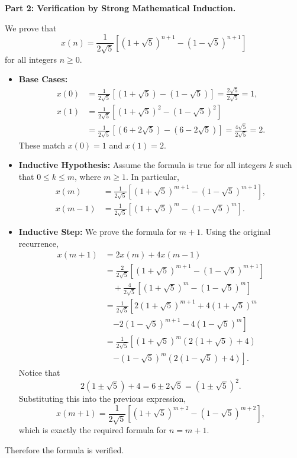 \documentclass[12pt,a4paper]{article}
\begin{document}
\textbf{Part 2: Verification by Strong Mathematical Induction.}

We prove that
\begin{equation*}
x(n)=\frac{1}{2\sqrt{5}}\left[(1+\sqrt{5})^{n+1}-(1-\sqrt{5})^{n+1}\right]
\end{equation*}
for all integers $n\ge 0$.
\begin{itemize}
    \item \textbf{Base Cases:}
    \begin{align*}
    x(0)&=\frac{1}{2\sqrt{5}}\left[(1+\sqrt{5})-(1-\sqrt{5})\right]
    =\frac{2\sqrt{5}}{2\sqrt{5}}=1, \\
    x(1)&=\frac{1}{2\sqrt{5}}\left[(1+\sqrt{5})^2-(1-\sqrt{5})^2\right] \\
    &=\frac{1}{2\sqrt{5}}\left[(6+2\sqrt{5})-(6-2\sqrt{5})\right]
    =\frac{4\sqrt{5}}{2\sqrt{5}}=2.
    \end{align*}
    These match $x(0)=1$ and $x(1)=2$.

    \item \textbf{Inductive Hypothesis:} Assume the formula is true for all integers $k$ such that $0\le k\le m$, where $m\ge 1$. In particular,
    \begin{align*}
    x(m)&=\frac{1}{2\sqrt{5}}\left[(1+\sqrt{5})^{m+1}-(1-\sqrt{5})^{m+1}\right], \\
    x(m-1)&=\frac{1}{2\sqrt{5}}\left[(1+\sqrt{5})^{m}-(1-\sqrt{5})^{m}\right].
    \end{align*}

    \item \textbf{Inductive Step:} We prove the formula for $m+1$. Using the original recurrence,
    \begin{align*}
    x(m+1) &= 2x(m) + 4x(m-1) \\
    &= \frac{2}{2\sqrt{5}}\left[(1+\sqrt{5})^{m+1}-(1-\sqrt{5})^{m+1}\right] \\
    &\quad +\frac{4}{2\sqrt{5}}\left[(1+\sqrt{5})^m-(1-\sqrt{5})^m\right] \\
    &= \frac{1}{2\sqrt{5}}\left[
    2(1+\sqrt{5})^{m+1}+4(1+\sqrt{5})^m \right. \\
    &\quad \left. -2(1-\sqrt{5})^{m+1}-4(1-\sqrt{5})^m
    \right] \\
    &= \frac{1}{2\sqrt{5}}\left[
    (1+\sqrt{5})^m(2(1+\sqrt{5})+4) \right. \\
    &\quad \left. -(1-\sqrt{5})^m(2(1-\sqrt{5})+4)
    \right].
    \end{align*}
    Notice that
    \begin{equation*}
    2(1\pm\sqrt{5})+4=6\pm 2\sqrt{5}=(1\pm\sqrt{5})^2.
    \end{equation*}
    Substituting this into the previous expression,
    \begin{equation*}
    x(m+1)=\frac{1}{2\sqrt{5}}\left[(1+\sqrt{5})^{m+2}-(1-\sqrt{5})^{m+2}\right],
    \end{equation*}
    which is exactly the required formula for $n=m+1$.
\end{itemize}
Therefore the formula is verified.
\end{document}
